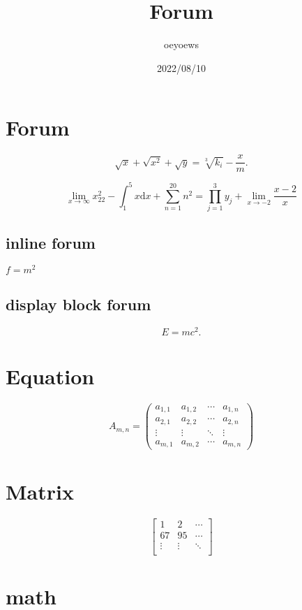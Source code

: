 \documentclass{article}
\title{Forum}
\author{oeyoews}
\date{2022/08/10}
\begin{document}
\maketitle

\section{Forum}%
\label{sec:Forum}

\[
  \sqrt{x} + \sqrt{x^2} +\sqrt{y} = \sqrt[3]{k_i} - \frac{x}{m}
.\]

$$  \lim_{x \to \infty} x^2_{22} - \int_{1}^{5}x\mathrm{d}x + \sum_{n=1}^{20} n^{2} = \prod_{j=1}^{3} y_{j}  + \lim_{x \to -2} \frac{x-2}{x} $$

\subsection{inline forum}%
\label{sub:inline forum}

$f = m^2$

\subsection{display block forum}%
\label{sub:display block forum}

\[
E = mc^2
.\]

\section{Equation}%
\label{sec:equation}

\begin{equation*}
A_{m,n} =
\begin{pmatrix}
a_{1,1} & a_{1,2} & \cdots & a_{1,n} \\
a_{2,1} & a_{2,2} & \cdots & a_{2,n} \\
\vdots  & \vdots  & \ddots & \vdots  \\
a_{m,1} & a_{m,2} & \cdots & a_{m,n}
\end{pmatrix}
\end{equation*}

\section{Matrix}%
\label{sec:matrix}

$$\begin{bmatrix}
1 & 2 & \cdots \\
67 & 95 & \cdots \\
\vdots  & \vdots & \ddots \\
\end{bmatrix}$$

\section{math}%
\label{sec:math}
\end{document}
